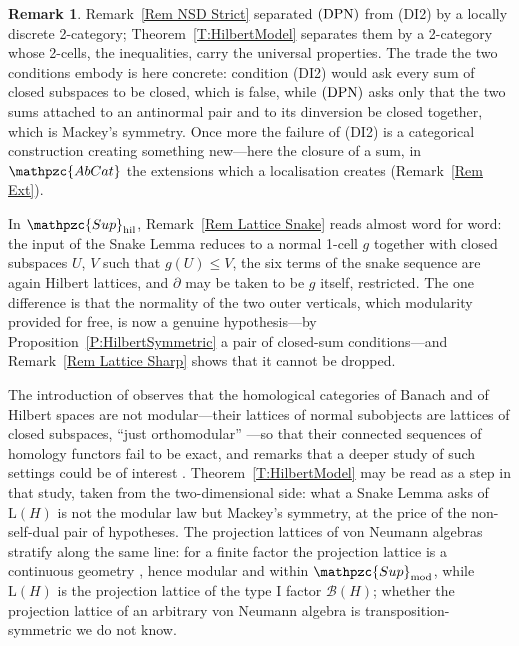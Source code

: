 \documentclass[reqno,a4paper]{amsart}
\numberwithin{equation}{section}
\theoremstyle{plain}
\theoremstyle{definition}
\newtheorem{remark}[subsection]{Remark}
\def\nameit#1{\textrm{#1}~}
\def\thex{\nameit{Theorem}}
\def\prox{\nameit{Proposition}}
\def\remx{\nameit{Remark}}
\newcommand{\catfont}[1]{\ensuremath{\mathpzc{#1}}\xspace}
\newcommand{\AbCat}{\catfont{AbCat}}
\newcommand{\Supmod}{\ensuremath{\mathpzc{Sup}_{\mathrm{mod}}}}
\newcommand{\Suphil}{\ensuremath{\mathpzc{Sup}_{\mathrm{hil}}}}
\renewcommand{\1}{\onecat{1}}
\newcommand{\Lat}{\ensuremath{\mathrm{L}}}
\newcommand{\DPN}{\textup{(DPN)}}
\begin{document}
\begin{remark}\label{Rem NSD Hilbert}
	\remx\ref{Rem NSD Strict} separated \(\DPN\) from \textup{(DI2)} by a locally discrete 2-category; \thex\ref{T:HilbertModel} separates them by a 2-category whose 2-cells, the inequalities, carry the universal properties. The trade the two conditions embody is here concrete: condition \textup{(DI2)} would ask every sum of closed subspaces to be closed, which is false, while \(\DPN\) asks only that the two sums attached to an antinormal pair and to its dinversion be closed together, which is Mackey's symmetry. Once more the failure of \textup{(DI2)} is a categorical construction creating something new---here the closure of a sum, in \(\AbCat\) the extensions which a localisation creates (\remx\ref{Rem Ext}).

	In \(\Suphil\), \remx\ref{Rem Lattice Snake} reads almost word for word: the input of the Snake Lemma reduces to a normal 1-cell \(g\) together with closed subspaces \(U\), \(V\) such that \(g(U)\leq V\), the six terms of the snake sequence are again Hilbert lattices, and \(\partial\) may be taken to be \(g\) itself, restricted. The one difference is that the normality of the two outer verticals, which modularity provided for free, is now a genuine hypothesis---by \prox\ref{P:HilbertSymmetric} a pair of closed-sum conditions---and \remx\ref{Rem Lattice Sharp} shows that it cannot be dropped.

	The introduction of \cite{Grandis-HA2} observes that the homological categories of Banach and of Hilbert spaces are not modular---their lattices of normal subobjects are lattices of closed subspaces, ``just orthomodular'' \cite[2.3.2]{Grandis-HA2}---so that their connected sequences of homology functors fail to be exact, and remarks that a deeper study of such settings could be of interest \cite[0.4]{Grandis-HA2}. \thex\ref{T:HilbertModel} may be read as a step in that study, taken from the two-dimensional side: what a Snake Lemma asks of \(\Lat(H)\) is not the modular law but Mackey's symmetry, at the price of the non-self-dual pair of hypotheses. The projection lattices of von Neumann algebras stratify along the same line: for a finite factor the projection lattice is a continuous geometry \cite{vNeu60}, hence modular and within \(\Supmod\), while \(\Lat(H)\) is the projection lattice of the type \(\mathrm{I}\) factor \(\mathcal{B}(H)\); whether the projection lattice of an arbitrary von Neumann algebra is transposition-symmetric we do not know.
\end{remark}
\end{document}
